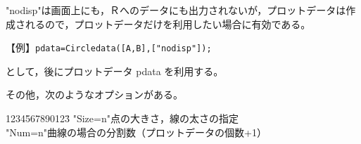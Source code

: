\documentclass[papersize,a4paper,12pt,uplatex]{jsarticle}
\begin{document}
 "nodisp"は画面上にも，Ｒへのデータにも出力されないが，プロットデータは作成されるので，プロットデータだけを利用したい場合に有効である。
 
\hspace{10mm}【例】\verb|pdata=Circledata([A,B],["nodisp"]);|

として，後にプロットデータ pdata を利用する。

その他，次のようなオプションがある。
\begin{tabbing}
1234\=567890123\=\kill
 \>"Size=n"\>点の大きさ，線の太さの指定\\
 \>"Num=n"\>曲線の場合の分割数（プロットデータの個数+1）\\
\end{tabbing}

\end{document}
